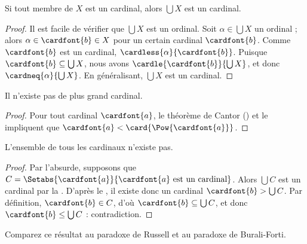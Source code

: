 \documentclass[../../../include/open-logic-section]{subfiles}
\begin{document}
\begin{prop}
Si tout membre de $X$ est un cardinal,
alors $\bigcup X$ est un cardinal.
\end{prop}

\begin{proof}
Il est facile de vérifier que $\bigcup X$
est un ordinal. Soit
$\alpha \in \bigcup X$ un ordinal ; alors
$\alpha \in \cardfont{b} \in X$
pour un certain cardinal $\cardfont{b}$.
Comme $\cardfont{b}$ est un cardinal,
$\cardless{\alpha}{\cardfont{b}}$.
Puisque $\cardfont{b} \subseteq \bigcup X$,
nous avons
$\cardle{\cardfont{b}}{\bigcup X}$,
et donc
$\cardneq{\alpha}{\bigcup X}$.
En généralisant, $\bigcup X$ est un cardinal.
\end{proof}

\begin{thm}
Il n'existe pas de plus grand cardinal.
\end{thm}

\begin{proof}
Pour tout cardinal $\cardfont{a}$, le théorème
de Cantor
() et le
impliquent que
$\cardfont{a} <
\card{\Pow{\cardfont{a}}}$.
\end{proof}

\begin{thm}
L'ensemble de tous les cardinaux n'existe pas.
\end{thm}

\begin{proof}
Par l'absurde, supposons que
$C = \Setabs{\cardfont{a}}
{\cardfont{a} \text{ est un cardinal}}$.
Alors $\bigcup C$ est un cardinal par la
. D'après le
, il existe donc
un cardinal $\cardfont{b} > \bigcup C$.
Par définition, $\cardfont{b} \in C$,
d'où $\cardfont{b} \subseteq \bigcup{C}$,
et donc $\cardfont{b} \leq \bigcup C$ :
contradiction.
\end{proof}

Comparez ce résultat au paradoxe de Russell
et au paradoxe de Burali-Forti.
\end{document}
